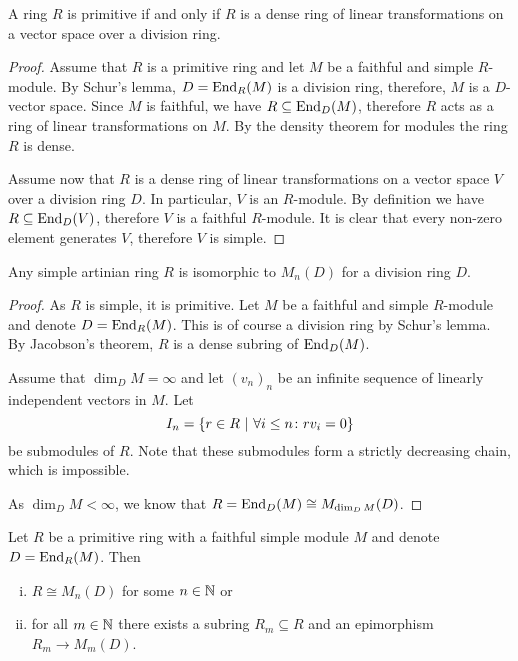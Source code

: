 \begin{izrek}[Jacobson]
A ring $R$ is primitive if and only if $R$ is a dense ring of
linear transformations on a vector space over a division ring.
\end{izrek}

\begin{proof}
Assume that $R$ is a primitive ring and let $M$ be a faithful and
simple $R$-module. By Schur's lemma, $D = \operatorname{End}_R(M)$ is a division
ring, therefore, $M$ is a $D$-vector space. Since $M$ is faithful,
we have $R \subseteq \operatorname{End}_D(M)$, therefore $R$ acts as a ring of
linear transformations on $M$. By the density theorem for modules
the ring $R$ is dense.

Assume now that $R$ is a dense ring of linear transformations on a
vector space $V$ over a division ring $D$. In particular, $V$ is
an $R$-module. By definition we have $R \subseteq \operatorname{End}_D(V)$,
therefore $V$ is a faithful $R$-module. It is clear that every
non-zero element generates $V$, therefore $V$ is simple.
\end{proof}

\begin{posledica}
Any simple artinian ring $R$ is isomorphic to $M_n(D)$ for a
division ring $D$.
\end{posledica}

\begin{proof}
As $R$ is simple, it is primitive. Let $M$ be a faithful and simple
$R$-module and denote $D = \operatorname{End}_R(M)$. This is of course a division
ring by Schur's lemma. By Jacobson's theorem, $R$ is a dense
subring of $\operatorname{End}_D(M)$.

Assume that $\dim_D M = \infty$ and let $(v_n)_n$ be an infinite
sequence of linearly independent vectors in $M$. Let
\[
I_n = \left\{r \in R~\middle\vert~\forall i \leq n \colon r v_i = 0\right\}
\]
be submodules of $R$. Note that these submodules form a strictly
decreasing chain, which is impossible.

As $\dim_D M < \infty$, we know that
$R = \operatorname{End}_D(M) \cong M_{\dim_D M}(D)$.
\end{proof}

\begin{izrek}[Structure]
Let $R$ be a primitive ring with a faithful simple module $M$ and
denote $D = \operatorname{End}_R(M)$. Then

\begin{enumerate}[i)]
\item $R \cong M_n(D)$ for some $n \in \mathbb{N}$ or
\item for all $m \in \mathbb{N}$ there exists a subring $R_m \subseteq R$
and an epimorphism $R_m \to M_m(D)$.
\end{enumerate}
\end{izrek}

